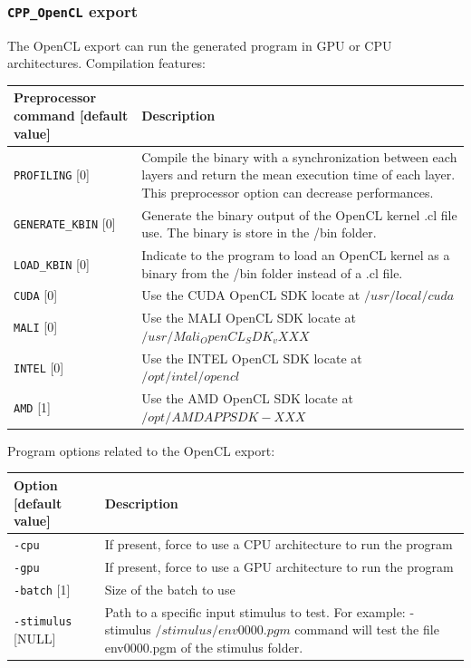 \documentclass[a4paper,11pt,oneside]{article}
\begin{document}
\subsubsection{\texorpdfstring{%
\lstinline[basicstyle=\ttfamily\bfseries]!CPP_OpenCL! export}
{CPP\_OpenCL export}}
The OpenCL export can run the generated program in GPU or CPU architectures.
Compilation features:
\begin{center}
 \begin{tabular}{| p{7cm} | p{8cm} | }
 \hline
 Preprocessor command [default value] & Description\\
 \hline\hline
  \lstinline!PROFILING! [0] & Compile the binary with a synchronization between
   each layers and return the mean execution time of each layer.
  This preprocessor option can decrease performances.\\
  \lstinline!GENERATE_KBIN! [0] & Generate the binary output of the OpenCL
  kernel .cl file use. The binary is store in the /bin folder. \\
  \lstinline!LOAD_KBIN! [0] & Indicate to the program to load an OpenCL
  kernel as a binary from the /bin folder instead of a .cl file. \\
  \lstinline!CUDA! [0] & Use the CUDA OpenCL SDK locate at
  ${/usr/local/cuda}$ \\
  \lstinline!MALI! [0] & Use the MALI OpenCL SDK locate at
  ${/usr/Mali_OpenCL_SDK_vXXX}$ \\
  \lstinline!INTEL! [0] & Use the INTEL OpenCL SDK locate at
  ${/opt/intel/opencl}$ \\
  \lstinline!AMD! [1] & Use the AMD OpenCL SDK locate at
  ${/opt/AMDAPPSDK-XXX}$ \\
 \hline
\end{tabular}
\end{center}

Program options related to the OpenCL export:
\begin{center}
 \begin{tabular}{| p{5cm} | p{10cm} | }
 \hline
 Option [default value] & Description\\
 \hline\hline
  \lstinline!-cpu! & If present, force to use a CPU architecture to run
  the program \\
  \lstinline!-gpu! & If present, force to use a GPU architecture to run
  the program \\
  \lstinline!-batch! [1] & Size of the batch to use \\
  \lstinline!-stimulus! [NULL] & Path to a specific input stimulus to test.
  For example: -stimulus ${/stimulus/env0000.pgm}$ command will test the file
  env0000.pgm  of the stimulus folder.\\
 \hline
\end{tabular}
\end{center}
\end{document}
